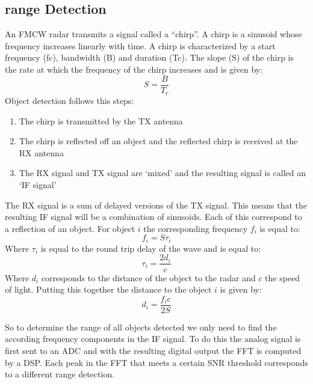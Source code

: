 \subsection{range Detection}
An \ac{FMCW} radar transmits a signal called a “chirp”. A chirp is a sinusoid whose frequency  increases linearly with time.
A chirp is characterized by a start frequency (fc), bandwidth (B) and duration (Tc). The slope (S) of the chirp is the rate at which the frequency of the chirp increases and is given by:
\begin{equation}
    S=\frac{B}{T_c}
\end{equation}
Object detection follows this steps:
\begin{enumerate}
    \item The chirp is transmitted by the TX antenna
    \item The chirp is reflected off an object and the reflected chirp is received at the RX antenna
    \item The RX signal and TX signal are ‘mixed’ and the resulting signal is called an ‘IF signal’
\end{enumerate}


The RX signal is a sum of delayed versions of the TX signal. This means that the resulting \ac{IF} signal will be a combination of sinusoids. Each of this correspond to a reflection of an object. For object $i$ the corresponding frequency $f_i$ is equal to:
\begin{equation}
    f_i=S\tau_i
\end{equation}
Where $\tau_i$ is equal to the round trip delay of the wave and is equal to:
\begin{equation}
    \tau_i=\frac{2d_i}{c}
\end{equation}
Where $d_i$ corresponds to the distance of the object to the radar and $c$ the speed of light.
Putting this together the distance to the object $i$ is given by:
\begin{equation}
    d_i=\frac{f_ic}{2S}
\end{equation}

 So to determine the range of all objects detected we only need to find the according frequency components in the \ac{IF} signal. To do this the analog signal is first sent to an \ac{ADC} and with the resulting digital output the \ac{FFT} is computed by a \ac{DSP}. Each peak in the \ac{FFT} that meets a certain \ac{SNR} threshold corresponds to a different range detection. 
 
